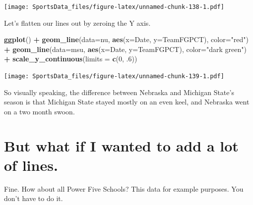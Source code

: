 \documentclass[]{book}
\newenvironment{Shaded}{\begin{snugshade}}{\end{snugshade}}
\newcommand{\KeywordTok}[1]{\textcolor[rgb]{0.13,0.29,0.53}{\textbf{#1}}}
\newcommand{\DataTypeTok}[1]{\textcolor[rgb]{0.13,0.29,0.53}{#1}}
\newcommand{\DecValTok}[1]{\textcolor[rgb]{0.00,0.00,0.81}{#1}}
\newcommand{\StringTok}[1]{\textcolor[rgb]{0.31,0.60,0.02}{#1}}
\newcommand{\OperatorTok}[1]{\textcolor[rgb]{0.81,0.36,0.00}{\textbf{#1}}}
\newcommand{\NormalTok}[1]{#1}
\begin{document}
\texttt{[image: SportsData\_files/figure-latex/unnamed-chunk-138-1.pdf]}

Let's flatten our lines out by zeroing the Y axis.

\begin{Shaded}
\begin{Highlighting}[]
\KeywordTok{ggplot}\NormalTok{() }\OperatorTok{+}\StringTok{ }\KeywordTok{geom_line}\NormalTok{(}\DataTypeTok{data=}\NormalTok{nu, }\KeywordTok{aes}\NormalTok{(}\DataTypeTok{x=}\NormalTok{Date, }\DataTypeTok{y=}\NormalTok{TeamFGPCT), }\DataTypeTok{color=}\StringTok{"red"}\NormalTok{) }\OperatorTok{+}\StringTok{ }\KeywordTok{geom_line}\NormalTok{(}\DataTypeTok{data=}\NormalTok{msu, }\KeywordTok{aes}\NormalTok{(}\DataTypeTok{x=}\NormalTok{Date, }\DataTypeTok{y=}\NormalTok{TeamFGPCT), }\DataTypeTok{color=}\StringTok{"dark green"}\NormalTok{) }\OperatorTok{+}\StringTok{ }\KeywordTok{scale_y_continuous}\NormalTok{(}\DataTypeTok{limits =} \KeywordTok{c}\NormalTok{(}\DecValTok{0}\NormalTok{, .}\DecValTok{6}\NormalTok{))}
\end{Highlighting}
\end{Shaded}

\texttt{[image: SportsData\_files/figure-latex/unnamed-chunk-139-1.pdf]}

So visually speaking, the difference between Nebraska and Michigan
State's season is that Michigan State stayed mostly on an even keel, and
Nebraska went on a two month swoon.

\section{But what if I wanted to add a lot of
lines.}\label{but-what-if-i-wanted-to-add-a-lot-of-lines.}

Fine. How about all Power Five Schools? This data for example purposes.
You don't have to do it.

\begin{Shaded}
\end{Shaded}
\end{document}
